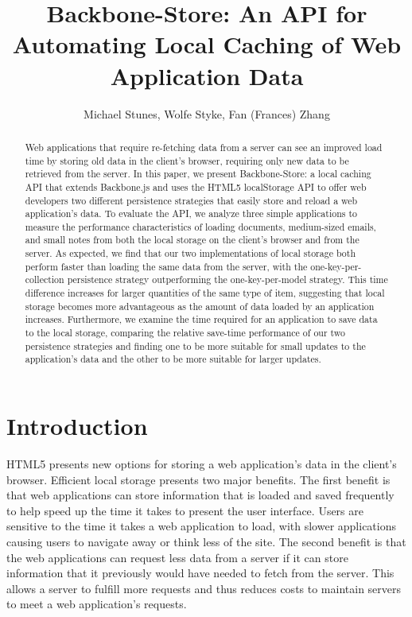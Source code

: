 \documentclass[12pt]{article}
\title{Backbone-Store: An API for Automating Local Caching of Web Application
Data}
\author{Michael Stunes, Wolfe Styke, Fan (Frances) Zhang}
\begin{document}
\maketitle

\begin{abstract}
Web applications that require re-fetching data from a server
can see an improved load time by storing old data in the client's browser,
requiring only new data to be retrieved from the server. In this paper, we present Backbone-Store: a local caching API that extends Backbone.js and uses the HTML5 localStorage API to offer web developers two different persistence strategies that easily store and reload a web application's data. To evaluate the API,  we analyze three simple applications to measure the performance characteristics of loading documents, medium-sized emails, and small notes from both the local storage on the client's browser and from the server. As expected, we find that our two implementations of local storage both perform faster than loading the same data from the server, with the one-key-per-collection persistence strategy outperforming the one-key-per-model strategy. This time difference increases for larger quantities of the same type of item, suggesting that local storage becomes more advantageous as the amount of data loaded by an application increases. Furthermore, we examine the time required for an application to save data to the local storage, comparing the relative save-time performance of our two persistence strategies and finding one to be more suitable for small updates to the application's data and the other to be more suitable for larger updates.
\end{abstract}

\section{Introduction}

HTML5 presents new options for storing a web application's data in the client's
browser. Efficient local storage presents two major
benefits. The first benefit is that web applications can store information that is loaded and saved
frequently to help speed up the time it takes to present the user
interface. Users are sensitive to the time it takes a
web application to load, with slower applications causing users to navigate
away or think less of the site. The second benefit is that the web applications
can request less data from a server if it can store information that it
previously would have needed to fetch from the server. This allows a server to
fulfill more requests and thus reduces costs to maintain servers to meet a web
application's requests.
\end{document}
